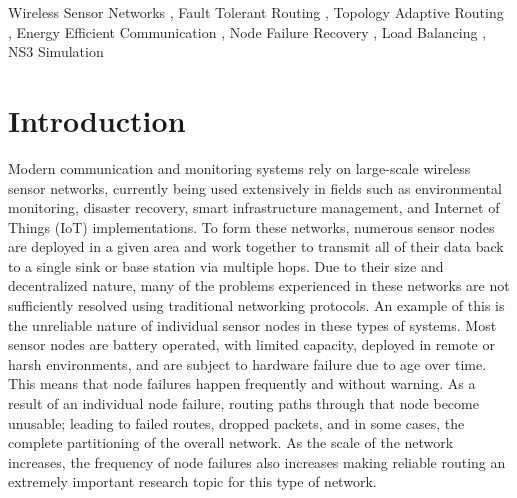 \documentclass[a4paper,fleqn]{cas-dc}
\numberwithin{equation}{section}
\begin{document}
\begin{keywords}
Wireless Sensor Networks \sep
Fault Tolerant Routing \sep
Topology Adaptive Routing \sep
Energy Efficient Communication \sep
Node Failure Recovery \sep
Load Balancing \sep
NS3 Simulation
\end{keywords}
\maketitle



\section{Introduction}
Modern communication and monitoring systems rely on large-scale wireless sensor networks, currently being used extensively in fields such as environmental monitoring, disaster recovery, smart infrastructure management, and Internet of Things (IoT) implementations. To form these networks, numerous sensor nodes are deployed in a given area and work together to transmit all of their data back to a single sink or base station via multiple hops. Due to their size and decentralized nature, many of the problems experienced in these networks are not sufficiently resolved using traditional networking protocols. An example of this is the unreliable nature of individual sensor nodes in these types of systems. Most sensor nodes are battery operated, with limited capacity, deployed in remote or harsh environments, and are subject to hardware failure due to age over time. This means that node failures happen frequently and without warning. As a result of an individual node failure, routing paths through that node become unusable; leading to failed routes, dropped packets, and in some cases, the complete partitioning of the overall network. As the scale of the network increases, the frequency of node failures also increases making reliable routing an extremely important research topic for this type of network.
\end{document}
